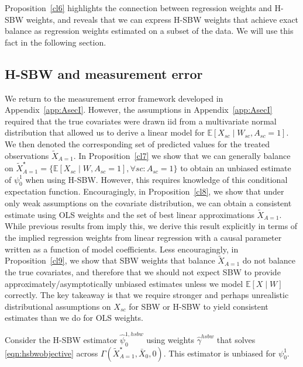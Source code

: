 Proposition~\ref{cl6} highlights the connection between regression weights and H-SBW weights, and reveals that we can express H-SBW weights that achieve exact balance as regression weights estimated on a subset of the data. We will use this fact in the following section. 

\subsection{H-SBW and measurement error}\label{app:AsecIII}

We return to the measurement error framework developed in Appendix~\ref{app:AsecI}. However, the assumptions in Appendix~\ref{app:AsecI} required that the true covariates were drawn iid from a multivariate normal distribution that allowed us to derive a linear model for $\mathbb{E}[X_{sc} \mid W_{sc}, A_{sc} = 1]$. We then denoted the corresponding set of predicted values for the treated observations $\tilde{X}_{A=1}$. In Proposition~\ref{cl7} we show that we can generally balance on $\tilde{X}^\star_{A=1} = \{\mathbb{E}[X_{sc} \mid W, A_{sc} = 1], \forall sc: A_{sc} = 1\}$ to obtain an unbiased estimate of $\psi_0^1$ when using H-SBW. However, this requires knowledge of this conditional expectation function. Encouragingly, in Proposition~\ref{cl8}, we show that under only weak assumptions on the covariate distribution, we can obtain a consistent estimate using OLS weights and the set of best linear approximations $\tilde{X}_{A=1}$. While previous results from \cite{gleser1992importance} imply this, we derive this result explicitly in terms of the implied regression weights from linear regression with a causal parameter written as a function of model coefficients. Less encouragingly, in Proposition~\ref{cl9}, we show that SBW weights that balance $\tilde{X}_{A=1}$ do not balance the true covariates, and therefore that we should not expect SBW to provide approximately/asymptotically unbiased estimates unless we model $\mathbb{E}[X \mid W]$ correctly. The key takeaway is that we require stronger and perhaps unrealistic distributional assumptions on $X_{sc}$ for SBW or H-SBW to yield consistent estimates than we do for OLS weights. 

\begin{proposition}\label{cl7}
    Consider the H-SBW estimator $\hat{\psi}_0^{1, hsbw}$ using weights $\hat{\gamma}^{hsbw}$ that solves \eqref{eqn:hsbwobjective} across $\Gamma(\tilde{X}^\star_{A=1}, \bar{X}_0, 0)$. This estimator is unbiased for $\psi_0^1$.
\end{proposition}

